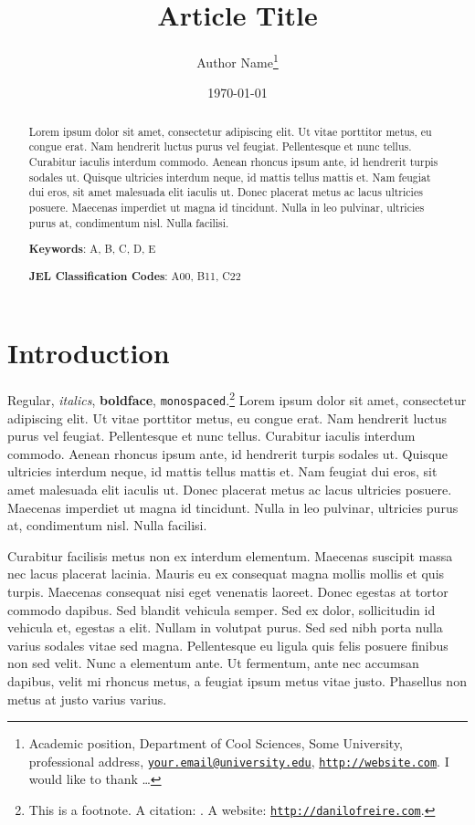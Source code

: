\documentclass[a4paper,12pt]{article}
\title{\textbf{Article Title}}
\author{Author Name\thanks{Academic position, Department of Cool Sciences, Some University, professional address,  \href{mailto:your.email@univesity.com}{\texttt{your.email@university.edu}},  \href{http://website.com}{\texttt{http://website.com}}. I would like to thank \dots}
}
\date{\today}
\begin{document}
\maketitle

\begin{abstract}
 \noindent
 Lorem ipsum dolor sit amet, consectetur adipiscing elit. Ut vitae porttitor metus, eu congue erat. Nam hendrerit luctus purus vel feugiat. Pellentesque et nunc tellus. Curabitur iaculis interdum commodo. Aenean rhoncus ipsum ante, id hendrerit turpis sodales ut. Quisque ultricies interdum neque, id mattis tellus mattis et. Nam feugiat dui eros, sit amet malesuada elit iaculis ut. Donec placerat metus ac lacus ultricies posuere. Maecenas imperdiet ut magna id tincidunt. Nulla in leo pulvinar, ultricies purus at, condimentum nisl. Nulla facilisi.

 \vspace{.5cm}
 \noindent
 \textbf{Keywords}: A, B, C, D, E

 \vspace{.25cm}
 \noindent
 \textbf{JEL Classification Codes}: A00, B11, C22
\end{abstract}

\newpage

\section{Introduction}
\label{sec:intro}

Regular, \textit{italics}, \textbf{boldface}, \texttt{monospaced}.\footnote{This is a footnote. A citation: \citet{chazkel2011laws}. A website: \href{http://danilofreire.com}{\texttt{http://danilofreire.com}}.} Lorem ipsum dolor sit amet, consectetur adipiscing elit. Ut vitae porttitor metus, eu congue erat. Nam hendrerit luctus purus vel feugiat. Pellentesque et nunc tellus. Curabitur iaculis interdum commodo. Aenean rhoncus ipsum ante, id hendrerit turpis sodales ut. Quisque ultricies interdum neque, id mattis tellus mattis et. Nam feugiat dui eros, sit amet malesuada elit iaculis ut. Donec placerat metus ac lacus ultricies posuere. Maecenas imperdiet ut magna id tincidunt. Nulla in leo pulvinar, ultricies purus at, condimentum nisl. Nulla facilisi.

Curabitur facilisis metus non ex interdum elementum. Maecenas suscipit massa nec lacus placerat lacinia. Mauris eu ex consequat magna mollis mollis et quis turpis. Maecenas consequat nisi eget venenatis laoreet. Donec egestas at tortor commodo dapibus. Sed blandit vehicula semper. Sed ex dolor, sollicitudin id vehicula et, egestas a elit. Nullam in volutpat purus. Sed sed nibh porta nulla varius sodales vitae sed magna. Pellentesque eu ligula quis felis posuere finibus non sed velit. Nunc a elementum ante. Ut fermentum, ante nec accumsan dapibus, velit mi rhoncus metus, a feugiat ipsum metus vitae justo. Phasellus non metus at justo varius varius. 
\end{document}
